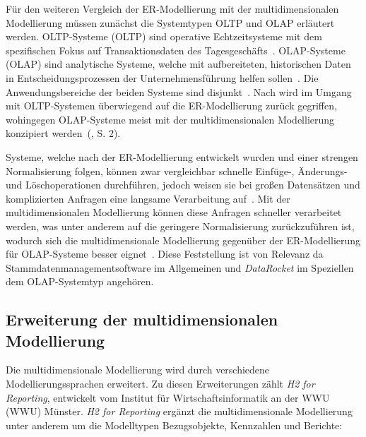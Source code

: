 \documentclass[
  language=german, %
  type=bachelor,%
  ngerman
]{isthesis}
\begin{document}
\begin{content}
	Für den weiteren Vergleich der \acrshort{ER}-Modellierung mit der
	multidimensionalen Modellierung müssen zunächst die Systemtypen
	\acrshort{OLTP} und \acrshort{OLAP} erläutert werden.  \acrlong{OLTP}-Systeme
	(\acrshort{OLTP}) sind operative Echtzeitsysteme mit dem spezifischen Fokus
	auf Transaktionsdaten des Tagesgeschäfts~\cite[][S.  11]{gabriel2009data}.
	\acrlong{OLAP}-Systeme (\acrshort{OLAP}) sind analytische Systeme, welche mit
	aufbereiteten, historischen Daten in Entscheidungsprozessen der
	Unternehmensführung helfen sollen~\cite[][S. 1]{chaudhuri1997overview}. Die
	Anwendungsbereiche der beiden Systeme sind disjunkt~\cite[][S.
	334]{chamoni2000line}. Nach \textsc{\citeauthor{phipps2002automating}} wird
	im Umgang mit \acrshort{OLTP}-Systemen überwiegend auf die ER-Modellierung
	zurück gegriffen, wohingegen \acrshort{OLAP}-Systeme meist mit der
	multidimensionalen Modellierung konzipiert
	werden~(\citeyear{phipps2002automating}, S. 2). 

	Systeme, welche nach der ER-Modellierung entwickelt wurden und einer strengen
	Normalisierung folgen, können zwar vergleichbar schnelle Einfüge-, Änderungs-
	und Löschoperationen durchführen, jedoch weisen sie bei großen Datensätzen
	und komplizierten Anfragen eine langsame Verarbeitung auf~\cite[][S.
	52]{ballard2012dimensional}. Mit der multidimensionalen Modellierung können
	diese Anfragen schneller verarbeitet werden, was unter anderem auf die
	geringere Normalisierung zurückzuführen ist, wodurch sich die
	multidimensionale Modellierung gegenüber der ER-Modellierung für
	\acrshort{OLAP}-Systeme besser eignet~\cite[][S.
	52]{ballard2012dimensional}. Diese Feststellung ist von Relevanz da
	Stammdatenmanagementsoftware im Allgemeinen und \textit{DataRocket} im
	Speziellen dem \acrlong{OLAP}-Systemtyp angehören.


	\subsection{Erweiterung der multidimensionalen Modellierung}

	Die multidimensionale Modellierung wird durch verschiedene
	Modellierungssprachen erweitert. Zu diesen Erweiterungen zählt \textit{H2 for
	Reporting}, entwickelt vom Institut für Wirtschaftsinformatik an der
	\acrlong{WWU} (WWU) Münster. \textit{H2
	for Reporting} ergänzt die multidimensionale Modellierung unter anderem um
	die Modelltypen Bezugsobjekte, Kennzahlen und Berichte:

	\begin{itemize}


\end{itemize}
\end{content}
\end{document}
